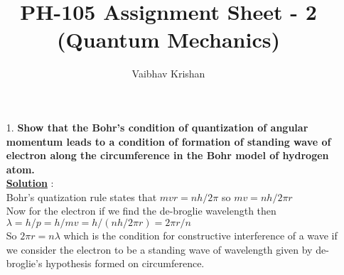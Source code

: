\documentclass[10pt, a4paper]{article}
\begin{document}
	\title{PH-105 Assignment Sheet - 2 (Quantum Mechanics)}
	\date{}
	\author{Vaibhav Krishan}
	\maketitle
	\newcommand{\angstrom}{\mbox{\normalfont\AA}}
	\begin{enumerate}
		\item[1.] {\bf Show that the Bohr’s condition of quantization of angular momentum leads to a condition of formation of standing wave of electron along the circumference in the Bohr model of hydrogen atom.}\\
		{\underline {\bf Solution}} :\\
		Bohr's quatization rule states that
		\begin{math} mvr = nh/2\pi \end{math} so \begin{math} mv = nh/2\pi r\end{math}\\
		Now for the electron if we find the de-broglie wavelength then
		\begin{math} \lambda = h/p = h/mv = h / (nh/2\pi r) = 2\pi r / n\end{math}\\
		So
		\begin{math} 2\pi r = n\lambda\end{math} which is the condition for constructive interference of a wave if we consider the electron to be a standing wave of wavelength given by de-broglie's hypothesis formed on circumference.\\
	\end{enumerate}
\end{document}
